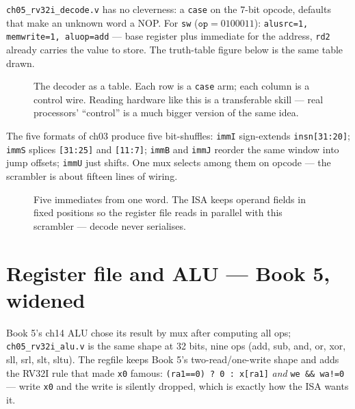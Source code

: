 \begin{example}\label{ex:ctrl05}
\texttt{ch05\_rv32i\_decode.v} has no cleverness: a \texttt{case}
on the 7-bit opcode, defaults that make an unknown word a NOP. For
\texttt{sw} ($\texttt{op}=0100011$): \texttt{alusrc=1, memwrite=1,
aluop=add} --- base register plus immediate for the address,
\texttt{rd2} already carries the value to store. The truth-table
figure below is the same table drawn.
\end{example}

\begin{figure}[t]
\centering

\caption[Control truth table]{The decoder as a table. Each row is a
\texttt{case} arm; each column is a control wire. Reading hardware
like this is a transferable skill --- real processors' ``control''
is a much bigger version of the same idea.}
\label{fig:control05}
\end{figure}

\begin{example}\label{ex:immgen05}
The five formats of ch03 produce five bit-shuffles: \texttt{immI}
sign-extends \texttt{insn[31:20]}; \texttt{immS} splices
\texttt{[31:25]} and \texttt{[11:7]}; \texttt{immB} and
\texttt{immJ} reorder the same window into jump offsets;
\texttt{immU} just shifts. One mux selects among them on opcode ---
the scrambler is about fifteen lines of wiring.
\end{example}

\begin{figure}[t]
\centering

\caption[Immediate generator]{Five immediates from one word. The ISA
keeps operand fields in fixed positions so the register file reads
in parallel with this scrambler --- decode never serialises.}
\label{fig:immgen05}
\end{figure}

\section{Register file and ALU --- Book 5, widened}
\label{sec:reused05}

\begin{example}\label{ex:mapping05}
Book 5's ch14 ALU chose its result by mux after computing all ops;
\texttt{ch05\_rv32i\_alu.v} is the same shape at 32 bits, nine ops
(add, sub, and, or, xor, sll, srl, slt, sltu). The regfile keeps
Book 5's
two-read/one-write shape and adds the RV32I rule that made
\texttt{x0} famous: \texttt{(ra1==0)\ ?\ 0\ :\ x[ra1]} \emph{and}
\texttt{we \&\& wa!=0} --- write \texttt{x0} and the write is
silently dropped, which is exactly how the ISA wants it.
\end{example}

